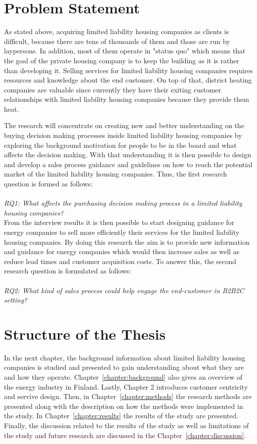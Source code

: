 \section{Problem Statement}

As stated above, acquiring limited liability housing companies as clients is difficult, because there are tens of thousands of them and those are run by laypersons. In addition, most of them operate in "status quo" which means that the goal of the private housing company is to keep the building as it is rather than developing it. Selling services for limited liability housing companies requires resources and knowledge about the end customer. On top of that, district heating companies are valuable since currently they have their exiting customer relationships with limited liability housing companies because they provide them heat.

The research will concentrate on creating new and better understanding on the buying decision making processes inside limited liability housing companies by exploring the background motivation for people to be in the board and what affects the decision making. With that understanding it is then possible to design and develop a sales process guidance and guidelines on how to reach the potential market of the limited liability housing companies. Thus, the first research question is formed as follows:\\\\
\emph{RQ1: What affects the purchasing decision making process in a limited liability housing companies?}\\

From the interview results it is then possible to start designing guidance for energy companies to sell more efficiently their services for the limited liability housing companies. By doing this research the aim is to provide new information and guidance for energy companies which would then increase sales as well as reduce lead times and customer acquisition costs. To answer this, the second research question is formulated as follows:\\\\
\emph{RQ2: What kind of sales process could help engage the end-customer in B2B2C setting?}\\

\section{Structure of the Thesis}
\label{section:structure} 

In the next chapter, the background information about limited liability housing companies is studied and presented to gain understanding about what they are and how they operate. Chapter~\ref{chapter:background} also gives an overview of the energy industry in Finland. Lastly, Chapter 2 introduces customer centricity and servive design. Then, in Chapter~\ref{chapter:methods} the research methods are presented along with the description on how the methods were implemented in the study. In Chapter~\ref{chapter:results} the results of the study are presented. Finally, the discussion related to the results of the study as well as limitations of the study and future research are discussed in the Chapter~\ref{chapter:discussion}.